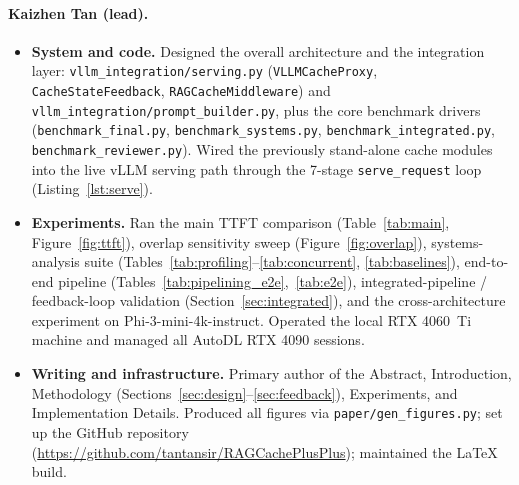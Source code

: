 \documentclass{article}
\begin{document}
\paragraph{Kaizhen Tan (lead).}
\begin{itemize}
\item \textbf{System and code.} Designed the overall architecture and the integration layer: \texttt{vllm\_integration/serving.py} (\texttt{VLLMCacheProxy}, \texttt{CacheStateFeedback}, \texttt{RAGCacheMiddleware}) and \texttt{vllm\_integration/prompt\_builder.py}, plus the core benchmark drivers (\texttt{benchmark\_final.py}, \texttt{benchmark\_systems.py}, \texttt{benchmark\_integrated.py}, \texttt{benchmark\_reviewer.py}). Wired the previously stand-alone cache modules into the live vLLM serving path through the 7-stage \texttt{serve\_request} loop (Listing~\ref{lst:serve}).
\item \textbf{Experiments.} Ran the main TTFT comparison (Table~\ref{tab:main}, Figure~\ref{fig:ttft}), overlap sensitivity sweep (Figure~\ref{fig:overlap}), systems-analysis suite (Tables~\ref{tab:profiling}--\ref{tab:concurrent}, \ref{tab:baselines}), end-to-end pipeline (Tables~\ref{tab:pipelining_e2e},~\ref{tab:e2e}), integrated-pipeline / feedback-loop validation (Section~\ref{sec:integrated}), and the cross-architecture experiment on Phi-3-mini-4k-instruct. Operated the local RTX 4060~Ti machine and managed all AutoDL RTX 4090 sessions.
\item \textbf{Writing and infrastructure.} Primary author of the Abstract, Introduction, Methodology (Sections~\ref{sec:design}--\ref{sec:feedback}), Experiments, and Implementation Details. Produced all figures via \texttt{paper/gen\_figures.py}; set up the GitHub repository (\url{https://github.com/tantansir/RAGCachePlusPlus}); maintained the LaTeX build.
\end{itemize}
\end{document}
